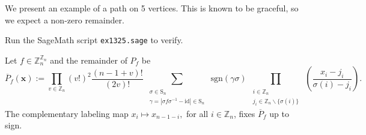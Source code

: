 \begin{example} We present an example of a path on 5 vertices. This is known to be graceful, so we expect a non-zero remainder.
\ \\
\begin{center}   
\end{center}
Run the SageMath script \texttt{ex1325.sage} to verify.
\end{example}
\begin{proposition}\label{prop:complementary-labeling-Symmetry}
Let $f\in\mathbb{Z}_{n}^{\mathbb{Z}_{n}}$ and the remainder of $P_f$ be
\begin{equation}
\overline{P}_f(\mathbf{x}):=\prod_{v\in\mathbb{Z}_{n}}\left(v!\right)^{2}\frac{\left(n-1+v\right)!}{\left(2v\right)!}\sum_{\begin{array}{c}
\substack{\sigma\in\text{S}_{n}\\
\gamma=\left|\sigma f\sigma^{-1}-\text{id}\right|\in\text{S}_{n}
}
\end{array}}\text{sgn}(\gamma\sigma)\prod_{\begin{array}{c}
\substack{i\in\mathbb{Z}_{n}\\
j_{i}\in\mathbb{Z}_{n}\backslash\{\sigma(i)\}
}
\end{array}}\left(\frac{x_{i}-j_{i}}{\sigma(i)-j_{i}}\right). 
\end{equation}
The complementary labeling map $x_{i}\mapsto x_{n-1-i},$ for all $i\in \mathbb{Z}_n$,
fixes $\overline{P}_f$ up to sign.
\end{proposition}
